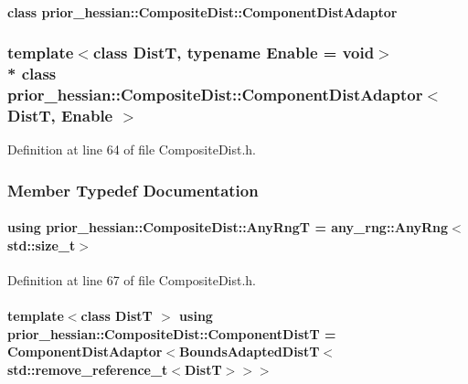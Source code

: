 \paragraph{class prior\+\_\+hessian\+:\+:Composite\+Dist\+:\+:Component\+Dist\+Adaptor}
\subsubsection*{template$<$class DistT, typename Enable = void$>$\\*
class prior\+\_\+hessian\+::\+Composite\+Dist\+::\+Component\+Dist\+Adaptor$<$ Dist\+T, Enable $>$}



Definition at line 64 of file Composite\+Dist.\+h.



\subsubsection{Member Typedef Documentation}
\paragraph[{\texorpdfstring{Any\+RngT}{AnyRngT}}]{\setlength{\rightskip}{0pt plus 5cm}using {\bf prior\+\_\+hessian\+::\+Composite\+Dist\+::\+Any\+RngT} =  any\+\_\+rng\+::\+Any\+Rng$<$std\+::size\+\_\+t$>$}\hypertarget{classprior__hessian_1_1CompositeDist_aa770eb02f04ec95a1e32044bb071281b}{}\label{classprior__hessian_1_1CompositeDist_aa770eb02f04ec95a1e32044bb071281b}


Definition at line 67 of file Composite\+Dist.\+h.

\paragraph[{\texorpdfstring{Component\+DistT}{ComponentDistT}}]{\setlength{\rightskip}{0pt plus 5cm}template$<$class DistT $>$ using {\bf prior\+\_\+hessian\+::\+Composite\+Dist\+::\+Component\+DistT} =  {\bf Component\+Dist\+Adaptor}$<${\bf Bounds\+Adapted\+DistT}$<$std\+::remove\+\_\+reference\+\_\+t$<$DistT$>$$>$$>$}\hypertarget{classprior__hessian_1_1CompositeDist_ab9b58a9ef851c7d5453273785d915c34}{}\label{classprior__hessian_1_1CompositeDist_ab9b58a9ef851c7d5453273785d915c34}


